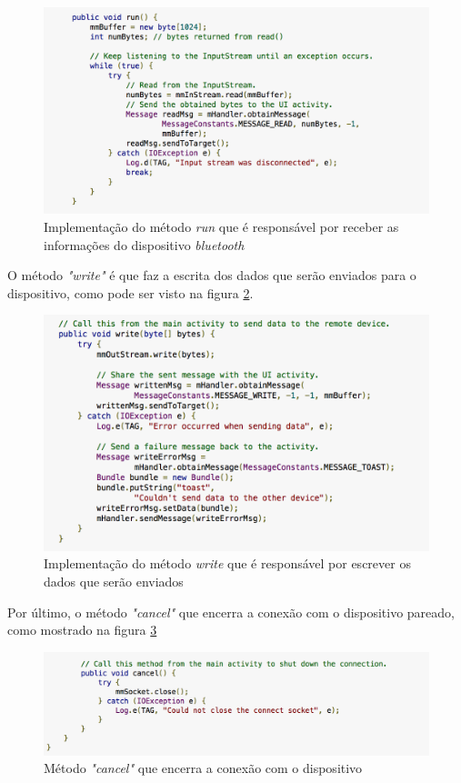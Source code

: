 \graphicspath{{figuras/}}
\begin{figure}[h!]
\centering
\includegraphics[scale=0.80]{run_method}
\caption{Implementação do método \textit{run} que é responsável por receber as informações do dispositivo \textit{bluetooth}}
\label{img:trecho3}
\end{figure}

O método \textit{"write"} é que faz a escrita dos dados que serão enviados para o dispositivo, como pode ser visto na figura \ref{img:trecho4}.

\graphicspath{{figuras/}}
\begin{figure}[h]
\centering
\includegraphics[scale=0.80]{write_method}
\caption{Implementação do método \textit{write} que é responsável por escrever os dados que serão enviados}
\label{img:trecho4}
\end{figure}

Por último, o método \textit{"cancel"} que encerra a conexão com o dispositivo pareado, como mostrado na figura \ref{img:trecho5}

\graphicspath{{figuras/}}
  \begin{figure}[h]
  \centering
  \includegraphics[scale=0.80]{cancel_method}
  \caption{Método \textit{"cancel"} que encerra a conexão com o dispositivo}
  \label{img:trecho5}
  \end{figure}  
  
